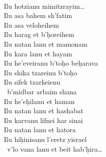 \documentclass[a4paper,10pt,openany]{memoir}
\newenvironment{HgTranslit}{\strut\\\noindent\begin{itshape}}{\end{itshape}\vspace{1em}}
\begin{document}
\noindent
\begin{minipage}{.32\textwidth}
  \begin{HgTranslit}
  \small
  Ilu hotzianu mimitzrayim\ldots \\
  Ilu asa bahem sh'fatim \\
  Ilu asa veloheihem \\
  Ilu harag et b'\d{h}oreihem \\
  Ilu natan lanu et mamonam \\
  Ilu kara lanu et hayam \\
  Ilu he'eveiranu b'to\d{h}o be\d{h}arava \\
  Ilu shika tzareinu b'to\d{h}o \\
  Ilu sifek tzarkeienu \\
  ~b'midbar arbaim shana \\
  Ilu he'e\d{h}ilanu et haman \\
  Ilu natan lanu et hashabat \\
  Ilu karvanu lifnei har sinai \\
  Ilu natan lanu et hatora \\
  Ilu hi\d{h}inisanu l'eretz yisrael \\
  ~v'lo vana lanu et beit hab'\d{h}ira\ldots
\end{HgTranslit}
\end{minipage}
\end{document}

